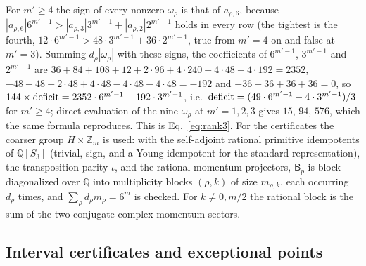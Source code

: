 \documentclass[aps,prx,reprint,superscriptaddress,nobibnotes,longbibliography]{revtex4-2}
\theoremstyle{remark}
\begin{document}
For $m'\ge4$ the sign of every nonzero $\omega_\rho$ is that of $a_{\rho,6}$, because $|a_{\rho,6}|6^{m'-1}>|a_{\rho,3}|3^{m'-1}+|a_{\rho,2}|2^{m'-1}$ holds in every row (the tightest is the fourth, $12\cdot6^{m'-1}>48\cdot3^{m'-1}+36\cdot2^{m'-1}$, true from $m'=4$ on and false at $m'=3$).  Summing $d_\rho|\omega_\rho|$ with these signs, the coefficients of $6^{m'-1}$, $3^{m'-1}$ and $2^{m'-1}$ are $36+84+108+12+2\cdot96+4\cdot240+4\cdot48+4\cdot192=2352$, $-48-48+2\cdot48+4\cdot48-4\cdot48-4\cdot48=-192$ and $-36-36+36+36=0$, so $144\times{\rm deficit}=2352\cdot6^{m'-1}-192\cdot3^{m'-1}$, i.e.\ ${\rm deficit}=(49\cdot6^{m'-1}-4\cdot3^{m'-1})/3$ for $m'\ge4$; direct evaluation of the nine $\omega_\rho$ at $m'=1,2,3$ gives $15$, $94$, $576$, which the same formula reproduces.  This is Eq.~\eqref{eq:rank3}.  For the certificates the coarser group $H\times\mathbb Z_m$ is used: with the self-adjoint rational primitive idempotents of $\mathbb Q[S_3]$ (trivial, sign, and a Young idempotent for the standard representation), the transposition parity $\iota$, and the rational momentum projectors, $\mathsf B_p$ is block diagonalized over $\mathbb Q$ into multiplicity blocks $(\rho,k)$ of size $m_{\rho,k}$, each occurring $d_\rho$ times, and $\sum_\rho d_\rho m_\rho=6^m$ is checked.  For $k\ne0,m/2$ the rational block is the sum of the two conjugate complex momentum sectors.

\subsection{Interval certificates and exceptional points}
\label{app:certificates}
\end{document}

